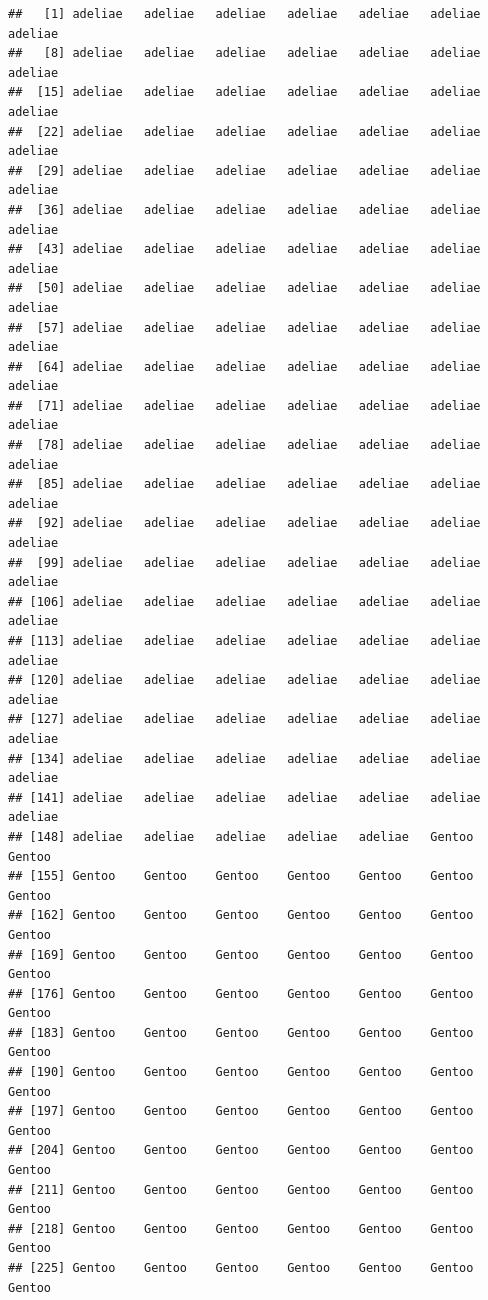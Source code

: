 \documentclass[
]{book}
\begin{document}
\begin{verbatim}
##   [1] adeliae   adeliae   adeliae   adeliae   adeliae   adeliae   adeliae  
##   [8] adeliae   adeliae   adeliae   adeliae   adeliae   adeliae   adeliae  
##  [15] adeliae   adeliae   adeliae   adeliae   adeliae   adeliae   adeliae  
##  [22] adeliae   adeliae   adeliae   adeliae   adeliae   adeliae   adeliae  
##  [29] adeliae   adeliae   adeliae   adeliae   adeliae   adeliae   adeliae  
##  [36] adeliae   adeliae   adeliae   adeliae   adeliae   adeliae   adeliae  
##  [43] adeliae   adeliae   adeliae   adeliae   adeliae   adeliae   adeliae  
##  [50] adeliae   adeliae   adeliae   adeliae   adeliae   adeliae   adeliae  
##  [57] adeliae   adeliae   adeliae   adeliae   adeliae   adeliae   adeliae  
##  [64] adeliae   adeliae   adeliae   adeliae   adeliae   adeliae   adeliae  
##  [71] adeliae   adeliae   adeliae   adeliae   adeliae   adeliae   adeliae  
##  [78] adeliae   adeliae   adeliae   adeliae   adeliae   adeliae   adeliae  
##  [85] adeliae   adeliae   adeliae   adeliae   adeliae   adeliae   adeliae  
##  [92] adeliae   adeliae   adeliae   adeliae   adeliae   adeliae   adeliae  
##  [99] adeliae   adeliae   adeliae   adeliae   adeliae   adeliae   adeliae  
## [106] adeliae   adeliae   adeliae   adeliae   adeliae   adeliae   adeliae  
## [113] adeliae   adeliae   adeliae   adeliae   adeliae   adeliae   adeliae  
## [120] adeliae   adeliae   adeliae   adeliae   adeliae   adeliae   adeliae  
## [127] adeliae   adeliae   adeliae   adeliae   adeliae   adeliae   adeliae  
## [134] adeliae   adeliae   adeliae   adeliae   adeliae   adeliae   adeliae  
## [141] adeliae   adeliae   adeliae   adeliae   adeliae   adeliae   adeliae  
## [148] adeliae   adeliae   adeliae   adeliae   adeliae   Gentoo    Gentoo   
## [155] Gentoo    Gentoo    Gentoo    Gentoo    Gentoo    Gentoo    Gentoo   
## [162] Gentoo    Gentoo    Gentoo    Gentoo    Gentoo    Gentoo    Gentoo   
## [169] Gentoo    Gentoo    Gentoo    Gentoo    Gentoo    Gentoo    Gentoo   
## [176] Gentoo    Gentoo    Gentoo    Gentoo    Gentoo    Gentoo    Gentoo   
## [183] Gentoo    Gentoo    Gentoo    Gentoo    Gentoo    Gentoo    Gentoo   
## [190] Gentoo    Gentoo    Gentoo    Gentoo    Gentoo    Gentoo    Gentoo   
## [197] Gentoo    Gentoo    Gentoo    Gentoo    Gentoo    Gentoo    Gentoo   
## [204] Gentoo    Gentoo    Gentoo    Gentoo    Gentoo    Gentoo    Gentoo   
## [211] Gentoo    Gentoo    Gentoo    Gentoo    Gentoo    Gentoo    Gentoo   
## [218] Gentoo    Gentoo    Gentoo    Gentoo    Gentoo    Gentoo    Gentoo   
## [225] Gentoo    Gentoo    Gentoo    Gentoo    Gentoo    Gentoo    Gentoo   

\end{verbatim}
\end{document}
